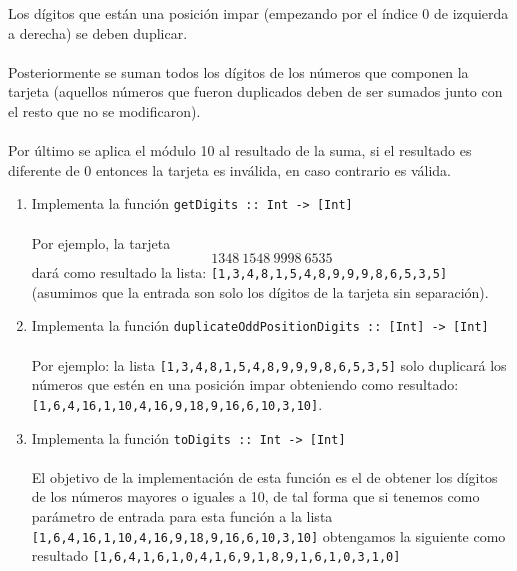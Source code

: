 \begin{exercise}
        Los dígitos que están una posición impar (empezando por el índice 0 de izquierda a derecha) se deben duplicar. \\\\
        Posteriormente se suman todos los dígitos de los números que componen la tarjeta (aquellos números que fueron duplicados deben de ser sumados junto con el resto que no se modificaron).\\\\
        Por último se aplica el módulo 10 al resultado de la suma, si el resultado es diferente de 0 entonces la tarjeta es inválida, en caso contrario es válida.\\
        \begin{enumerate} 
           \item  Implementa la función {\tt getDigits :: Int ->\ [Int]} \\\\
                  Por ejemplo, la tarjeta \[1348\ 1548\ 9998\ 6535\] dará como resultado la lista: \texttt{[1,3,4,8,1,5,4,8,9,9,9,8,6,5,3,5]} \\
                  (asumimos que la entrada son solo los dígitos de la tarjeta sin separación).\\
           \item  Implementa la función \texttt{duplicateOddPositionDigits ::  [Int] ->\ [Int]} \\\\
                  Por ejemplo: la lista \texttt{[1,3,4,8,1,5,4,8,9,9,9,8,6,5,3,5]} solo duplicará los números que estén en una posición impar obteniendo como resultado: \texttt{[1,6,4,16,1,10,4,16,9,18,9,16,6,10,3,10]}. \\
           \item  Implementa la función \texttt{toDigits :: Int ->\ [Int]}\\\\
                  El objetivo de la implementación de esta función es el de obtener los dígitos de los números mayores o iguales a 10, de tal forma que si tenemos como parámetro de entrada para esta función a la lista \texttt{[1,6,4,16,1,10,4,16,9,18,9,16,6,10,3,10]} obtengamos la siguiente como resultado \texttt{[1,6,4,1,6,1,0,4,1,6,9,1,8,9,1,6,1,0,3,1,0]} \\

\end{enumerate}
\end{exercise}
